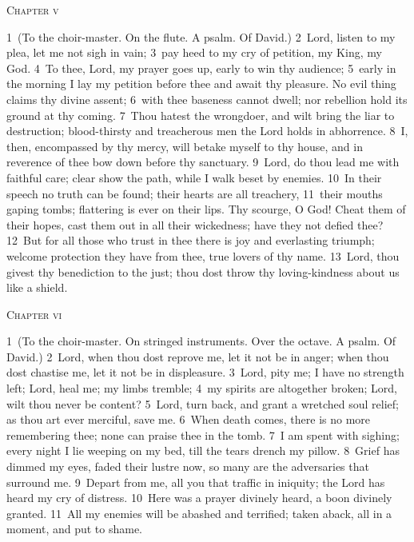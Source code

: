 \documentclass[10pt]{book} %
\begin{document}
\begin{large}\begin{center}\textsc{Chapter v}\end{center}\end{large}
\textcolor{benred8}{1}~(To the choir-master. On the flute. A psalm. Of David.)
\textcolor{benred8}{2}~Lord, listen to my plea, let me not sigh in vain; \textcolor{benred8}{3}~pay heed to my cry of petition, my King, my God. \textcolor{benred8}{4}~To thee, Lord, my prayer goes up, early to win thy audience; \textcolor{benred8}{5}~early in the morning I lay my petition before thee and await thy pleasure. No evil thing claims thy divine assent; \textcolor{benred8}{6}~with thee baseness cannot dwell; nor rebellion hold its ground at thy coming. \textcolor{benred8}{7}~Thou hatest the wrongdoer, and wilt bring the liar to destruction; blood-thirsty and treacherous men the Lord holds in abhorrence. \textcolor{benred8}{8}~I, then, encompassed by thy mercy, will betake myself to thy house, and in reverence of thee bow down before thy sanctuary.
\textcolor{benred8}{9}~Lord, do thou lead me with faithful care; clear show the path, while I walk beset by enemies. \textcolor{benred8}{10}~In their speech no truth can be found; their hearts are all treachery, \textcolor{benred8}{11}~their mouths gaping tombs; flattering is ever on their lips. Thy scourge, O God! Cheat them of their hopes, cast them out in all their wickedness; have they not defied thee? \textcolor{benred8}{12}~But for all those who trust in thee there is joy and everlasting triumph; welcome protection they have from thee, true lovers of thy name. \textcolor{benred8}{13}~Lord, thou givest thy benediction to the just; thou dost throw thy loving-kindness about us like a shield.
\begin{large}\begin{center}\textsc{Chapter vi}\end{center}\end{large}
\textcolor{benred8}{1}~(To the choir-master. On stringed instruments. Over the octave. A psalm. Of David.)
\textcolor{benred8}{2}~Lord, when thou dost reprove me, let it not be in anger; when thou dost chastise me, let it not be in displeasure. \textcolor{benred8}{3}~Lord, pity me; I have no strength left; Lord, heal me; my limbs tremble; \textcolor{benred8}{4}~my spirits are altogether broken; Lord, wilt thou never be content? \textcolor{benred8}{5}~Lord, turn back, and grant a wretched soul relief; as thou art ever merciful, save me. \textcolor{benred8}{6}~When death comes, there is no more remembering thee; none can praise thee in the tomb. \textcolor{benred8}{7}~I am spent with sighing; every night I lie weeping on my bed, till the tears drench my pillow. \textcolor{benred8}{8}~Grief has dimmed my eyes, faded their lustre now, so many are the adversaries that surround me. \textcolor{benred8}{9}~Depart from me, all you that traffic in iniquity; the Lord has heard my cry of distress. \textcolor{benred8}{10}~Here was a prayer divinely heard, a boon divinely granted. \textcolor{benred8}{11}~All my enemies will be abashed and terrified; taken aback, all in a moment, and put to shame.
\end{document}
